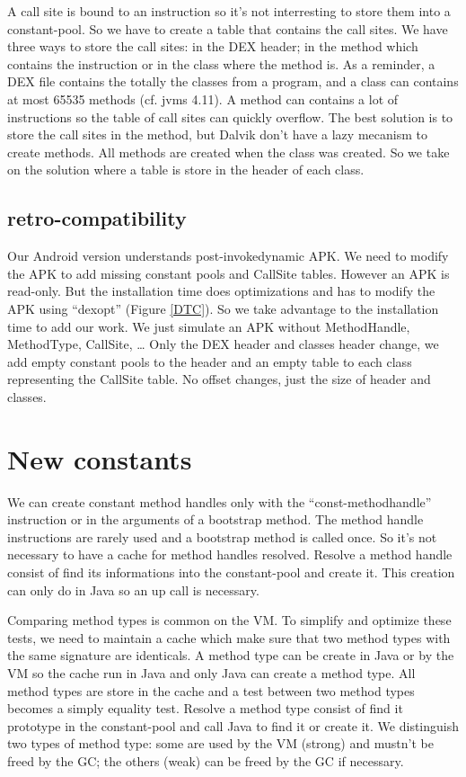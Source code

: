 \documentclass{sig-alternate}
\def \DALVIK{Dalvik\xspace}
\def \ANDROID{Android\xspace}
\begin{document}
    A call site is bound to an instruction so it's not interresting to store them into a constant-pool.
    So we have to create a table that contains the call sites.
    We have three ways to store the call sites: in the DEX header; in the method which contains the instruction or in the class where the method is.
    As a reminder, a DEX file contains the totally the classes from a program, and a class can contains at most 65535 methods (cf. jvms 4.11).
    A method can contains a lot of instructions so the table of call sites can quickly overflow.
    The best solution is to store the call sites in the method, but \DALVIK don't have a lazy mecanism to create methods.
    All methods are created when the class was created.
    So we take on the solution where a table is store in the header of each class.

  \subsection{retro-compatibility}
    Our \ANDROID version understands post-invokedynamic APK.
    We need to modify the APK to add missing constant pools and CallSite tables.
    However an APK is read-only.
    But the installation time does optimizations and has to modify the APK using ``dexopt'' (Figure \ref{DTC}).
    So we take advantage to the installation time to add our work.
    We just simulate an APK without MethodHandle, MethodType, CallSite, \dots
    Only the DEX header and classes header change, we add empty constant pools to the header
    and an empty table to each class representing the CallSite table.
    No offset changes, just the size of header and classes.

\section{New constants}

  We can create constant method handles only with the ``const-methodhandle'' instruction or in the arguments of a bootstrap method.
  The method handle instructions are rarely used and a bootstrap method is called once.
  So it's not necessary to have a cache for method handles resolved.
  Resolve a method handle consist of find its informations into the constant-pool and create it.
  This creation can only do in Java so an up call is necessary.

  Comparing method types is common on the VM.
  To simplify and optimize these tests, we need to maintain a cache which make sure that two method types with the same signature are identicals.
  A method type can be create in Java or by the VM so the cache run in Java and only Java can create a method type.
  All method types are store in the cache and a test between two method types becomes a simply equality test.
  Resolve a method type consist of find it prototype in the constant-pool and call Java to find it or create it.
  We distinguish two types of method type: some are used by the VM (strong) and mustn't be freed by the GC; the others (weak) can be freed by the GC if necessary.
\end{document}
